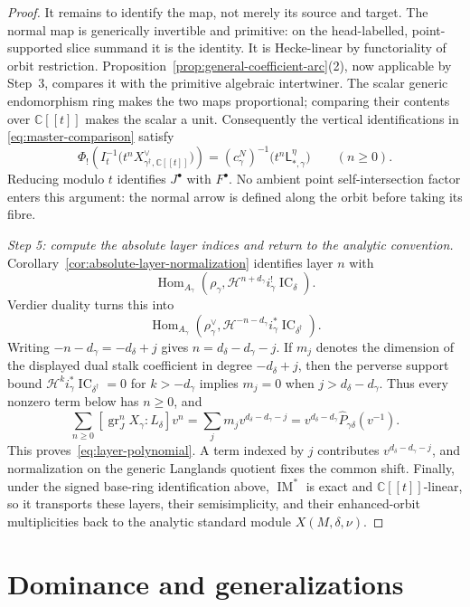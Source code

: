\documentclass[10pt,a4paper]{amsart}
\newcommand{\C}{\mathbb C}
\newcommand{\A}{\C[[t]]}
\newcommand{\IC}{\operatorname{IC}}
\begin{document}
\begin{proof}
It remains to identify the map, not merely its source and target.
The normal map is generically invertible and primitive: on the
head-labelled, point-supported slice summand it is the identity.
It is Hecke-linear by functoriality of orbit restriction.
Proposition~\ref{prop:general-coefficient-arc}(2), now applicable by
Step~3, compares it with the primitive algebraic intertwiner.
The scalar generic endomorphism ring makes the two maps proportional; comparing
their contents over $\A$ makes the scalar a unit.
Consequently the vertical identifications in
\eqref{eq:master-comparison} satisfy
\[
 \Phi_!\!\left(I_t^{-1}
       \bigl(t^nX_{\gamma^\dagger,\A}^{\vee}\bigr)\right)
 =(c_\gamma^N)^{-1}
       \bigl(t^n\mathsf L_{*,\gamma}^{\eta}\bigr)
 \qquad(n\geq0).
\]
Reducing modulo $t$ identifies $J^\bullet$ with $F^\bullet$.
No ambient point self-intersection factor enters this argument:
the normal arrow is defined along the orbit before taking its fibre.

\smallskip
\noindent\emph{Step 5: compute the absolute layer indices and return to the
analytic convention.}
Corollary~\ref{cor:absolute-layer-normalization} identifies layer $n$ with
\[
 \operatorname{Hom}_{A_\gamma}\!\left(
  \rho_\gamma,
  \mathcal H^{n+d_\gamma}i_\gamma^!\IC_\delta
 \right).
\]
Verdier duality turns this into
\[
 \operatorname{Hom}_{A_\gamma}\!\left(
  \rho_\gamma^\vee,
  \mathcal H^{-n-d_\gamma}i_\gamma^*\IC_{\delta^\dagger}
 \right).
\]
Writing $-n-d_\gamma=-d_\delta+j$ gives
$n=d_\delta-d_\gamma-j$.  If $m_j$ denotes the dimension of the displayed
dual stalk coefficient in degree $-d_\delta+j$, then the perverse support
bound $\mathcal H^ki_\gamma^*\IC_{\delta^\dagger}=0$ for
$k>-d_\gamma$ implies
$m_j=0$ when $j>d_\delta-d_\gamma$.  Thus every nonzero term below has
$n\geq0$, and
\[
 \sum_{n\geq0}[\operatorname{gr}_J^nX_\gamma:L_\delta]v^n
 =\sum_jm_jv^{d_\delta-d_\gamma-j}
 =v^{d_\delta-d_\gamma}\widehat P_{\gamma\delta}(v^{-1}).
\]
This proves~\eqref{eq:layer-polynomial}.  A term indexed by $j$
contributes $v^{d_\delta-d_\gamma-j}$, and normalization on the generic
Langlands quotient fixes the common shift.  Finally, under the signed
base-ring identification above,
$\operatorname{IM}^*$ is exact and $\mathbb C[[t]]$-linear, so it transports
these layers, their semisimplicity, and their enhanced-orbit multiplicities
back to the analytic standard module $X(M,\delta,\nu)$.
\end{proof}


\section{Dominance and generalizations}
\label{sec:dominance}
\end{document}
